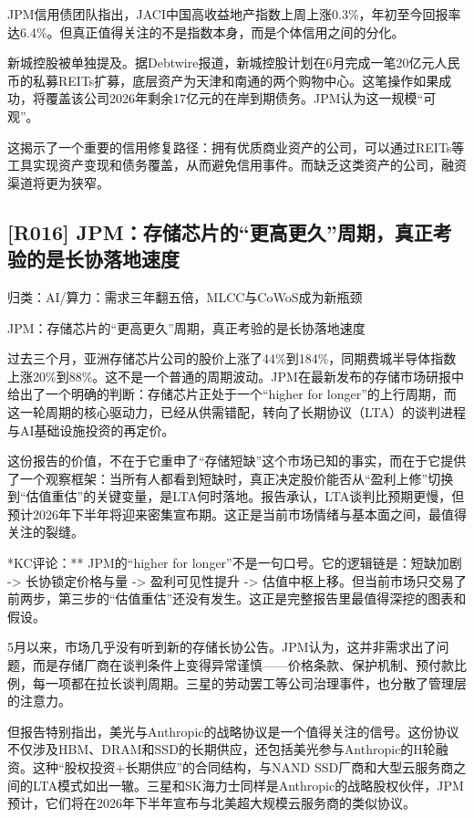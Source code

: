 \documentclass[11pt]{ctexart}
\begin{document}
JPM信用债团队指出，JACI中国高收益地产指数上周上涨0.3\%，年初至今回报率达6.4\%。但真正值得关注的不是指数本身，而是个体信用之间的分化。

新城控股被单独提及。据Debtwire报道，新城控股计划在6月完成一笔20亿元人民币的私募REITs扩募，底层资产为天津和南通的两个购物中心。这笔操作如果成功，将覆盖该公司2026年剩余17亿元的在岸到期债务。JPM认为这一规模“可观”。

这揭示了一个重要的信用修复路径：拥有优质商业资产的公司，可以通过REITs等工具实现资产变现和债务覆盖，从而避免信用事件。而缺乏这类资产的公司，融资渠道将更为狭窄。

\subsection{[R016] JPM：存储芯片的“更高更久”周期，真正考验的是长协落地速度}
{\small\color{refgray}归类：AI/算力：需求三年翻五倍，MLCC与CoWoS成为新瓶颈}

JPM：存储芯片的“更高更久”周期，真正考验的是长协落地速度

过去三个月，亚洲存储芯片公司的股价上涨了44\%到184\%，同期费城半导体指数上涨20\%到88\%。这不是一个普通的周期波动。JPM在最新发布的存储市场研报中给出了一个明确的判断：存储芯片正处于一个“higher for longer”的上行周期，而这一轮周期的核心驱动力，已经从供需错配，转向了长期协议（LTA）的谈判进程与AI基础设施投资的再定价。

这份报告的价值，不在于它重申了“存储短缺”这个市场已知的事实，而在于它提供了一个观察框架：当所有人都看到短缺时，真正决定股价能否从“盈利上修”切换到“估值重估”的关键变量，是LTA何时落地。报告承认，LTA谈判比预期更慢，但预计2026年下半年将迎来密集宣布期。这正是当前市场情绪与基本面之间，最值得关注的裂缝。

*KC评论：** JPM的“higher for longer”不是一句口号。它的逻辑链是：短缺加剧 -> 长协锁定价格与量 -> 盈利可见性提升 -> 估值中枢上移。但当前市场只交易了前两步，第三步的“估值重估”还没有发生。这正是完整报告里最值得深挖的图表和假设。

5月以来，市场几乎没有听到新的存储长协公告。JPM认为，这并非需求出了问题，而是存储厂商在谈判条件上变得异常谨慎——价格条款、保护机制、预付款比例，每一项都在拉长谈判周期。三星的劳动罢工等公司治理事件，也分散了管理层的注意力。

但报告特别指出，美光与Anthropic的战略协议是一个值得关注的信号。这份协议不仅涉及HBM、DRAM和SSD的长期供应，还包括美光参与Anthropic的H轮融资。这种“股权投资+长期供应”的合同结构，与NAND SSD厂商和大型云服务商之间的LTA模式如出一辙。三星和SK海力士同样是Anthropic的战略股权伙伴，JPM预计，它们将在2026年下半年宣布与北美超大规模云服务商的类似协议。
\end{document}
